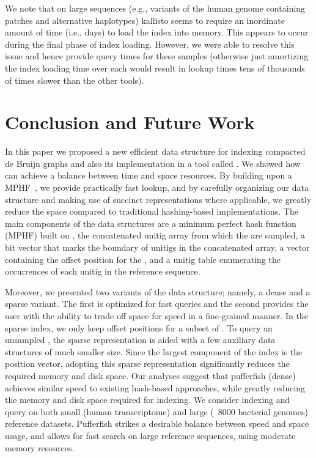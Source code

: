 We note that on large sequences (e.g., variants of the human genome containing patches and alternative haplotypes)
kallisto seems to require an inordinate amount of time (i.e., days) to load the index into memory. This appears to
occur during the final phase of index loading. However, we were able to resolve this issue and hence
provide \kmer query times for these samples (otherwise just amortizing the index loading time over each \kmer would result
in lookup times tens of thousands of times slower than the other tools).

\section{Conclusion and Future Work}
In this paper we proposed a new efficient data structure for indexing compacted de Bruijn graphs and also its implementation in a tool called \pufferfish. We showed how \pufferfish can achieve a balance between time and space resources. By building upon a MPHF~\cite{limasset2017fast}, we provide practically fast \kmer lookup, and by carefully organizing our data structure and making use of succinct representations where applicable, we greatly reduce the space compared to traditional hashing-based implementations. The main components of the data structures are a minimum perfect hash function (MPHF) built on \kmers, the concatenated unitig array from which the \kmers are sampled, a bit vector that marks the boundary of unitigs in the concatenated array, a vector containing the offset position for the \kmers, and a unitig table enumerating the occurrences of each unitig in the reference sequence.

Moreover, we presented two variants of the \pufferfish data structure; namely, a dense and a sparse variant. The first is optimized for fast queries and the second provides the user with the ability to trade off space for speed in a fine-grained manner. In the sparse index, we only keep offset positions for a subset of \kmers. To query an unsampled \kmer, the sparse representation is aided with a few auxiliary data structures of much smaller size. Since the largest component of the index is the position vector, adopting this sparse representation significantly reduces the required memory and disk space. Our analyses suggest that pufferfish (dense) achieves similar speed to existing hash-based approaches, while greatly reducing the memory and disk space required for indexing. We consider indexing and query on both small (human transcriptome) and large (~8000 bacterial genomes) reference datasets. Pufferfish strikes a desirable balance between speed and space usage, and allows for fast search on large reference sequences, using moderate memory resources. 


